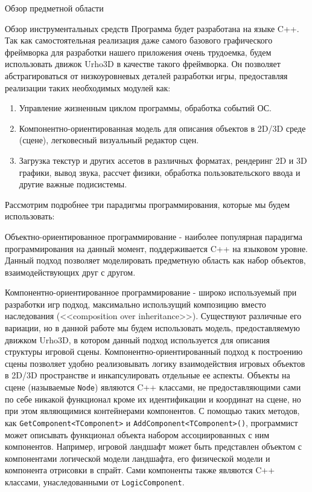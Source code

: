 \begin{section}{Обзор предметной области}
		\begin{subsection}{Обзор инструментальных средств}
			Программа будет разработана на языке C++.
			Так как самостоятельная реализация даже самого базового графического фреймворка для разработки нашего приложения очень трудоемка, будем использовать движок Urho3D в качестве такого фреймворка.
			Он позволяет абстрагироваться от низкоуровневых деталей разработки игры, предоставляя реализации таких необходимых модулей как:
			\begin{enumerate}
				\item Управление жизненным циклом программы, обработка событий ОС.
				\item Компонентно-ориентированная модель для описания объектов в 2D/3D среде (сцене), легковесный визуальный редактор сцен.
				\item Загрузка текстур и других ассетов в различных форматах, рендеринг 2D и 3D графики, вывод звука, рассчет физики, обработка пользовательского ввода и другие важные подисистемы.
			\end{enumerate}

			Рассмотрим подробнее три парадигмы программирования, которые мы будем использовать:

			Объектно-ориентированное программирование - наиболее популярная парадигма программирования на данный момент, поддерживается C++ на языковом уровне.
			Данный подход позволяет моделировать предметную область как набор объектов, взаимодействующих друг с другом.

			Компонентно-ориентированное программирование - широко используемый при разработки игр подход, максимально использущий композицию вместо наследования (<<composition over inheritance>>).
			Существуют различные его вариации, но в данной работе мы будем использовать модель, предоставляемую движком Urho3D, в котором данный подход используется для описания структуры игровой сцены.
			Компонентно-ориентированный подход к построению сцены позволяет удобно реализовывать логику взаимодействия игровых объектов в 2D/3D пространстве и инкапсулировать отдельные ее аспекты.
			Объекты на сцене (называемые \verb|Node|) являются C++ классами, не предоставляющими сами по себе никакой функционал кроме их идентификации и координат на сцене, но при этом являющимися контейнерами компонентов.
			С помощью таких методов, как \verb|GetComponent<TComponent>| и \verb|AddComponent<TComponent>()|, программист может описывать функционал объекта набором ассоциированных с ним компонентов.
			Например, игровой ландшафт может быть представлен объектом с компонентами логической модели ландшафта, его физической модели и компонента отрисовки в спрайт.
			Сами компоненты также являются C++ классами, унаследованными от \verb|LogicComponent|.


\end{subsection}
\end{section}

